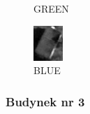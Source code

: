 \documentclass[a4paper,12pt]{article}  %
\begin{document}
\begin{figure}[H]
\begin{minipage}{0.24\textwidth}
        \caption*{GREEN}
    \end{minipage}
    \begin{minipage}{0.24\textwidth}
        \centering
        \includegraphics[width=\linewidth]{spektralne/blue_budynek3_bezmaski.png}
        \caption*{BLUE}
    \end{minipage}
\end{figure}

\subsubsection{Budynek nr 3}
\end{document}
